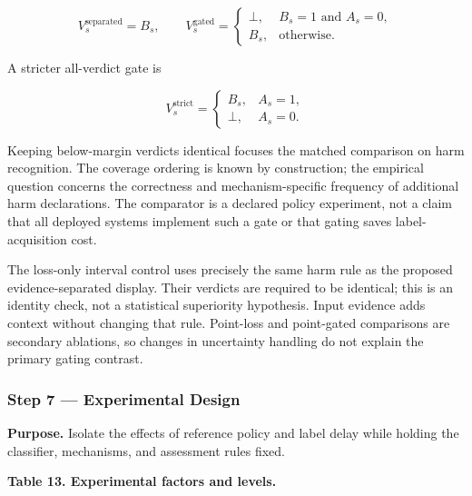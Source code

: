\documentclass[
]{article}
\begin{document}
\[
V_s^{\mathrm{separated}}=B_s,
\qquad
V_s^{\mathrm{gated}}=
\begin{cases}
\bot, & B_s=1 \text{ and } A_s=0,\\
B_s, & \text{otherwise}.
\end{cases}
\]

A stricter all-verdict gate is

\[
V_s^{\mathrm{strict}}=
\begin{cases}
B_s, & A_s=1,\\
\bot, & A_s=0.
\end{cases}
\]

Keeping below-margin verdicts identical focuses the matched comparison
on harm recognition. The coverage ordering is known by construction; the
empirical question concerns the correctness and mechanism-specific
frequency of additional harm declarations. The comparator is a declared
policy experiment, not a claim that all deployed systems implement such
a gate or that gating saves label-acquisition cost.

The loss-only interval control uses precisely the same harm rule as the
proposed evidence-separated display. Their verdicts are required to be
identical; this is an identity check, not a statistical superiority
hypothesis. Input evidence adds context without changing that rule.
Point-loss and point-gated comparisons are secondary ablations, so
changes in uncertainty handling do not explain the primary gating
contrast.

\hypertarget{step-7-experimental-design}{%
\subsubsection{Step 7 --- Experimental
Design}\label{step-7-experimental-design}}

\textbf{Purpose.} Isolate the effects of reference policy and label
delay while holding the classifier, mechanisms, and assessment rules
fixed.

\textbf{Table 13. Experimental factors and levels.}
\end{document}
